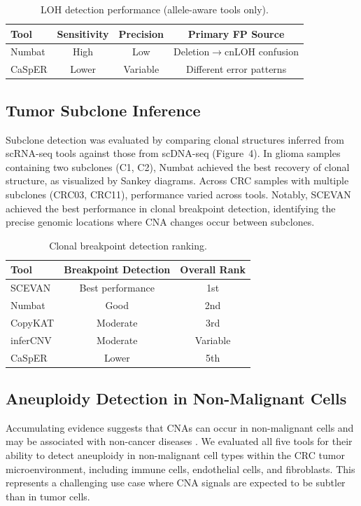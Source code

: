 \documentclass[11pt]{article}
\begin{document}
\begin{table}[H]
\centering
\caption{LOH detection performance (allele-aware tools only).}
\label{tab:loh}
\begin{tabular}{lccc}
\toprule
Tool & Sensitivity & Precision & Primary FP Source \\
\midrule
Numbat & High & Low & Deletion$\to$cnLOH confusion \\
CaSpER & Lower & Variable & Different error patterns \\
\bottomrule
\end{tabular}
\end{table}

\subsection{Tumor Subclone Inference}

Subclone detection was evaluated by comparing clonal structures inferred from scRNA-seq tools against those from scDNA-seq (Figure~4). In glioma samples containing two subclones (C1, C2), Numbat achieved the best recovery of clonal structure, as visualized by Sankey diagrams. Across CRC samples with multiple subclones (CRC03, CRC11), performance varied across tools. Notably, SCEVAN achieved the best performance in clonal breakpoint detection, identifying the precise genomic locations where CNA changes occur between subclones.

\begin{table}[H]
\centering
\caption{Clonal breakpoint detection ranking.}
\label{tab:breakpoint}
\begin{tabular}{lcc}
\toprule
Tool & Breakpoint Detection & Overall Rank \\
\midrule
SCEVAN & Best performance & 1st \\
Numbat & Good & 2nd \\
CopyKAT & Moderate & 3rd \\
inferCNV & Moderate & Variable \\
CaSpER & Lower & 5th \\
\bottomrule
\end{tabular}
\end{table}

\subsection{Aneuploidy Detection in Non-Malignant Cells}

Accumulating evidence suggests that CNAs can occur in non-malignant cells and may be associated with non-cancer diseases \citep{Knouse2014,McConnell2013}. We evaluated all five tools for their ability to detect aneuploidy in non-malignant cell types within the CRC tumor microenvironment, including immune cells, endothelial cells, and fibroblasts. This represents a challenging use case where CNA signals are expected to be subtler than in tumor cells.
\end{document}
